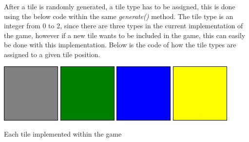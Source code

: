\documentclass[a4paper,12pt]{extarticle}
\begin{document}
\noindent After a tile is randomly generated, a tile type has to be assigned, this is done using the below code within the same \textit{generate()} method. The tile type is an integer from 0 to 2, since there are three types in the current implementation of the game, however if a new tile wants to be included in the game, this can easily be done with this implementation. Below is the code of how the tile types are assigned to a given tile position.

\begin{center}
\includegraphics[scale=1]{greyTile.png}
\hspace{1mm}
\includegraphics[scale=1]{greenTile.png}
\hspace{1mm}
\includegraphics[scale=1]{blueTile.png}
\hspace{1mm}
\includegraphics[scale=1]{yellowTile.png}
\hspace{1mm}

Each tile implemented within the game
\end{center}
\end{document}
